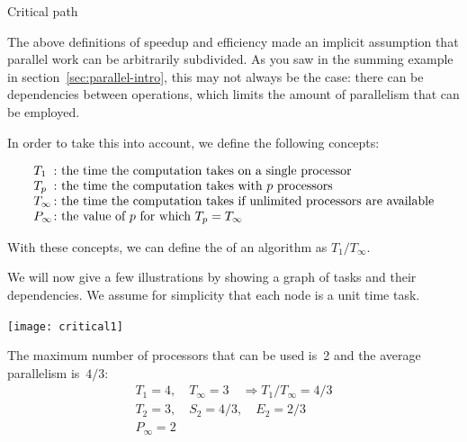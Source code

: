  {Critical path}
\label{sec:critical-path}

The above definitions of speedup and efficiency made an implicit assumption
that parallel work can be arbitrarily subdivided.
As you saw in the summing example in section~\ref{sec:parallel-intro},
this may not always be the case: there can be dependencies between
operations, which limits the amount of parallelism that can be
employed.

In order to take this into account, we define the following concepts:
\begin{definition}
  \[ 
  \begin{array}{l@{\colon}l}
    T_1&\hbox{the time the computation takes on a single processor}\\
    T_p&\hbox{the time the computation takes with $p$ processors}\\
    T_\infty&\hbox{the time the computation takes if unlimited processors are available}\\
    P_\infty&\hbox{the value of $p$ for which $T_p=T_\infty$}
  \end{array}  
  \]
\end{definition}
With these concepts, we can define the 
of an algorithm as $T_1/T_\infty$.

We will now give a few illustrations by showing a graph of tasks and their dependencies.
We assume for simplicity that each node is a unit time task.

\begin{minipage}{\textwidth}
  \begin{minipage}{.25\textwidth}
    \texttt{[image: critical1]}
  \end{minipage}
  \begin{minipage}{.75\textwidth}
    The maximum number of processors that can be used is~2 and the
    average parallelism is~$4/3$:
    \[
    \begin{array}{l}
      T_1=4,\quad T_\infty=3 \quad\Rightarrow T_1/T_\infty=4/3\\
      T_2=3,\quad S_2=4/3,\quad E_2=2/3\\
      P_\infty=2
    \end{array}
    \]
  \end{minipage}
\end{minipage}

